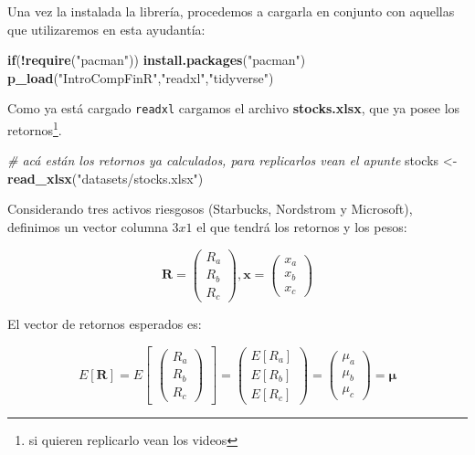 \documentclass[12pt,]{book}
\newenvironment{Shaded}{\begin{snugshade}}{\end{snugshade}}
\newcommand{\KeywordTok}[1]{\textcolor[rgb]{0.13,0.29,0.53}{\textbf{#1}}}
\newcommand{\StringTok}[1]{\textcolor[rgb]{0.31,0.60,0.02}{#1}}
\newcommand{\CommentTok}[1]{\textcolor[rgb]{0.56,0.35,0.01}{\textit{#1}}}
\newcommand{\ControlFlowTok}[1]{\textcolor[rgb]{0.13,0.29,0.53}{\textbf{#1}}}
\newcommand{\OperatorTok}[1]{\textcolor[rgb]{0.81,0.36,0.00}{\textbf{#1}}}
\newcommand{\NormalTok}[1]{#1}
\begin{document}
Una vez la instalada la librería, procedemos a cargarla en conjunto con
aquellas que utilizaremos en esta ayudantía:

\begin{Shaded}
\begin{Highlighting}[]
\ControlFlowTok{if}\NormalTok{(}\OperatorTok{!}\KeywordTok{require}\NormalTok{(}\StringTok{"pacman"}\NormalTok{)) }\KeywordTok{install.packages}\NormalTok{(}\StringTok{"pacman"}\NormalTok{)}
\KeywordTok{p_load}\NormalTok{(}\StringTok{"IntroCompFinR"}\NormalTok{,}\StringTok{"readxl"}\NormalTok{,}\StringTok{"tidyverse"}\NormalTok{)}
\end{Highlighting}
\end{Shaded}

Como ya está cargado \texttt{readxl} cargamos el archivo
\textbf{stocks.xlsx}, que ya posee los retornos\footnote{si quieren
  replicarlo vean los videos}.

\begin{Shaded}
\begin{Highlighting}[]
\CommentTok{# acá están los retornos ya calculados, para replicarlos vean el apunte}
\NormalTok{stocks <-}\StringTok{ }\KeywordTok{read_xlsx}\NormalTok{(}\StringTok{"datasets/stocks.xlsx"}\NormalTok{)}
\end{Highlighting}
\end{Shaded}

Considerando tres activos riesgosos (Starbucks, Nordstrom y Microsoft),
definimos un vector columna \(3x1\) el que tendrá los retornos y los
pesos:

\[
\mathbf{R} = 
\begin{pmatrix}
    R_{a}  \\
    R_{b}  \\
    R_{c} 
\end{pmatrix}
,
\mathbf{x} =
\begin{pmatrix}
    x_{a} \\
    x_{b} \\
    x_{c}
\end{pmatrix}
\]

El vector de retornos esperados es:

\[
E[\mathbf{R}] = E 
\begin{bmatrix} 
\begin{pmatrix}
    R_{a}  \\
    R_{b}  \\
    R_{c} 
\end{pmatrix}
\end{bmatrix}
    = 
\begin{pmatrix}
  E[R_{a}]  \\
  E[R_{b}]  \\
  E[R_{c}] 
\end{pmatrix}
    =
\begin{pmatrix}
    \mu_{a}  \\
    \mu_{b}  \\
    \mu_{c} 
\end{pmatrix}
    =
\mathbf{\mu}
\]
\end{document}
